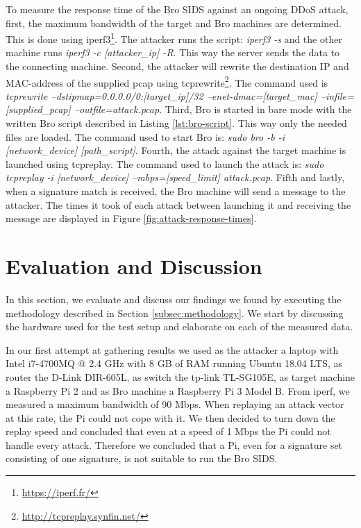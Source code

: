 To measure the response time of the Bro SIDS against an ongoing DDoS attack, first, the maximum bandwidth of the target and Bro machines are determined. This is done using iperf3\footnote{\url{https://iperf.fr/}}. The attacker runs the script: \emph{iperf3 -s} and the other machine runs \emph{iperf3 -c [attacker\_ip] -R}. This way the server sends the data to the connecting machine. Second, the attacker will rewrite the destination IP and MAC-address of the supplied pcap using tcprewrite\footnote{\url{http://tcpreplay.synfin.net/}}. The command used is \emph{tcprewrite --dstipmap=0.0.0.0/0:[target\_ip]/32 --enet-dmac=[target\_mac] --infile=[supplied\_pcap] --outfile=attack.pcap}. Third, Bro is started in bare mode with the written Bro script described in Listing \ref{lst:bro-script}. This way only the needed files are loaded. The command used to start Bro is: \emph{sudo bro -b -i [network\_device] [path\_script]}. Fourth, the attack against the target machine is launched using tcpreplay. The command used to launch the attack is: \emph{sudo tcpreplay -i [network\_device] --mbps=[speed\_limit] attack.pcap}. Fifth and lastly, when a signature match is received, the Bro machine will send a message to the attacker. The times it took of each attack between launching it and receiving the message are displayed in Figure \ref{fig:attack-response-times}.



\section{Evaluation and Discussion}\label{subsec:evaluation-discussion}
In this section, we evaluate and discuss our findings we found by executing the methodology described in Section \ref{subsec:methodology}. We start by discussing the hardware used for the test setup and elaborate on each of the measured data.

In our first attempt at gathering results we used as the attacker a laptop with Intel i7-4700MQ @ 2.4 GHz with 8 GB of RAM running Ubuntu 18.04 LTS, as router the D-Link DIR-605L, as switch the tp-link TL-SG105E, as target machine a Raspberry Pi 2 and as Bro machine a Raspberry Pi 3 Model B. From iperf, we measured a maximum bandwidth of 90 Mbps. When replaying an attack vector at this rate, the Pi could not cope with it. We then decided to turn down the replay speed and concluded that even at a speed of 1 Mbps the Pi could not handle every attack. Therefore we concluded that a Pi, even for a signature set consisting of one signature, is not suitable to run the Bro SIDS.  

